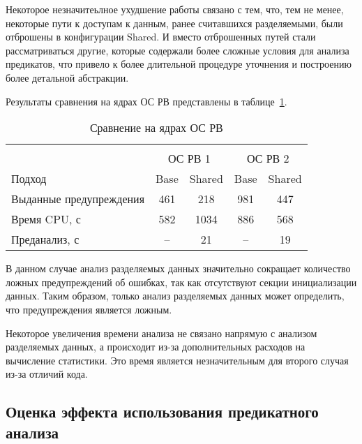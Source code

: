 Некоторое незначитеьлное ухудшение работы связано с тем, что, тем не менее, некоторые пути к доступам к данным, ранее считавшихся разделяемыми, были отброшены в конфигурации Shared.
И вместо отброшенных путей стали рассматриваться другие, которые содержали более сложные условия для анализа предикатов, что привело к более длительной процедуре уточнения и построению более детальной абстракции.

Результаты сравнения на ядрах ОС РВ представлены в таблице~\ref{table-os-shared}.

  \begin{table}[h]\footnotesize \centering
    \caption{Сравнение на ядрах ОС РВ}
  	\label{table-os-shared}
    \begin{tabular}{ | l | c | c | c | c |  }
      \hline
      		& 		\multicolumn{4}{c|}{\combatmode}  \\
      		& 			 \multicolumn{2}{c|}{ОС РВ 1} & 	\multicolumn{2}{c|}{ОС РВ 2}\\
      Подход         					& Base  & Shared  	& Base  & Shared 	\\ \hline
      Выданные предупреждения			& 461   & 218    	& 981   & 447  			\\ 
  	  Время CPU, с 						& 582   & 1034  	& 886   & 568  		\\ 
  	  \hspace{0.5cm} Преданализ, с 		& --   	& 21  		& --   	& 19  		\\ 
      \hline
    \end{tabular}
  \end{table}

В данном случае анализ разделяемых данных значительно сокращает количество ложных предупреждений об ошибках, так как отсутствуют секции инициализации данных.
Таким образом, только анализ разделяемых данных может определить, что предупреждения является ложным.

Некоторое увеличения времени анализа не связано напрямую с анализом разделяемых данных, а происходит из-за дополнительных расходов на вычисление статистики.
Это время является незначительным для второго случая из-за отличий кода.

\subsection{Оценка эффекта использования предикатного анализа}

